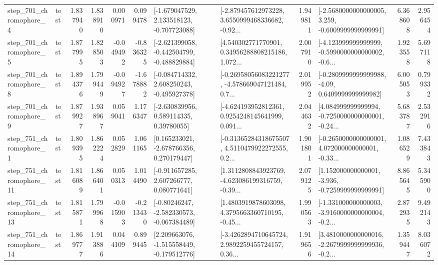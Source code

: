 \begin{tabular}{llrrrrllrlrr}
   step\_701\_chromophore\_4 &      test &      1.837940 &    1.838910 &      0.000971 &  0.099478 &   [-1.679047529, 2.133518123, -0.707723088] &  [-2.879457612973228, 3.6550999468336682, -0.92... &       1.949811 &  [-2.5680000000000005, 3.259, -0.6009999999999991] &            6.368608 &          2.956454 \\
   step\_701\_chromophore\_5 &      test &      1.877995 &    1.828503 &     -0.049492 & -0.836325 &  [-2.621399058, -0.442504799, -0.488829884] &  [4.540302771770901, 0.34956288808215186, 1.072... &       2.007910 &  [-4.123999999999999, -0.5990000000000002, -0.6... &            1.923558 &          5.697118 \\
   step\_701\_chromophore\_8 &      test &      1.894376 &    1.799449 &     -0.094927 & -1.678882 &   [-0.084714332, 2.608250243, -0.495927378] &  [-0.26958056083221277, -4.578669047121484, 0.7... &       2.019952 &   [-0.2809999999999988, -4.09, 0.6409999999999982] &            6.005053 &          0.799332 \\
   step\_701\_chromophore\_9 &      test &      1.879927 &    1.938967 &      0.059041 &  1.176347 &     [-2.630839956, 0.589114335, 0.39780055] &  [-4.624193952812361, 0.9254248145641999, 0.091... &       2.044632 &  [4.084999999999994, -0.7250000000000001, -0.24... &            5.683787 &          2.532916 \\
   step\_751\_chromophore\_1 &      test &      1.809395 &    1.862224 &      0.052829 &  1.061165 &    [0.165233021, -2.678766356, 0.270179447] &  [-0.31365284318675507, 4.5110479922272555, 0.2... &       1.901801 &  [-0.2650000000000001, 4.072000000000001, -0.33... &            1.086529 &          7.433843 \\
  step\_751\_chromophore\_11 &      test &      1.816089 &    1.866401 &      0.050313 &  1.014490 &    [-0.911657285, 2.607266777, 0.080771641] &  [1.3112808843923769, -4.623086199316759, -0.39... &       2.079125 &   [1.152000000000001, -3.936, -0.7259999999999991] &            8.865645 &          5.345900 \\
  step\_751\_chromophore\_13 &      test &      1.815871 &    1.799968 &     -0.015903 & -0.213430 &   [-0.80246247, -2.582330573, -0.067384489] &  [1.4803919878603098, 4.3795663360710195, -0.45... &       1.990563 &  [-1.331000000000003, -3.9160000000000004, -0.2... &            2.872935 &          9.492143 \\
  step\_751\_chromophore\_14 &      test &      1.869777 &    1.913886 &      0.044109 &  0.899445 &   [2.209663076, -1.515558449, -0.179512776] &  [-3.4262894710645724, 2.9892259455724157, 0.36... &       1.919656 &  [3.4810000000000016, -2.2679999999999936, -0.2... &            1.359447 &          8.036072 \\

\end{tabular}
